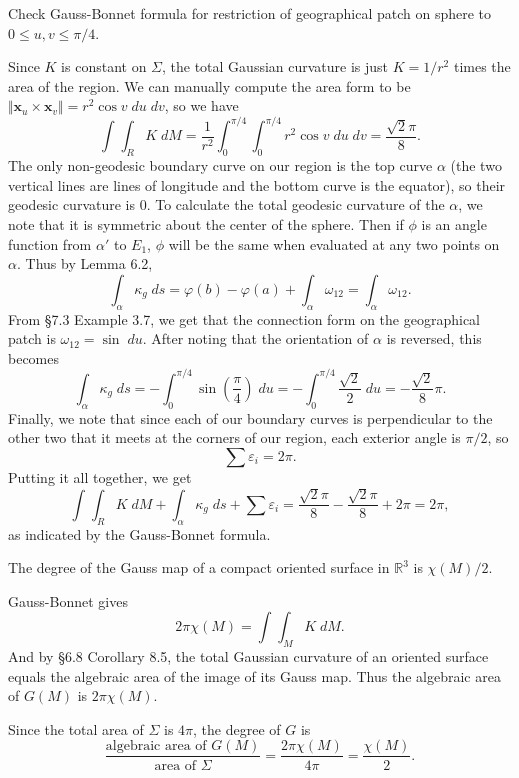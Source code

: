 \documentclass[10pt]{report}
\begin{document}
\pagebreak
\begin{exer}[7.6: 7]
Check Gauss-Bonnet formula for restriction of geographical patch on sphere to $0 \leq u,v \leq \pi/4$.
\end{exer}
Since $K$ is constant on $\Sigma$, the total Gaussian curvature is just $K=1/r^2$ times the area of the region. We can manually compute the area form to be ${\Vert{\mathbf{x}_{u}\times \mathbf{x}_{v}}\Vert} = r^2\cos v\;du\;dv$, so we have
\[
\int_{} \int_{R} K\;dM = \frac{1}{r^2} \int_{0}^{\pi/4} \int_{0}^{\pi/4} r^2 \cos v\;du\;dv = \frac{\sqrt{2} \pi}{8} .
\] 
The only non-geodesic boundary curve on our region is the top curve $\alpha$ (the two vertical lines are lines of longitude and the bottom curve is the equator), so their geodesic curvature is 0. To calculate the total geodesic curvature of the $\alpha$, we note that it is symmetric about the center of the sphere. Then if $\phi$ is an angle function from $\alpha'$ to $E_1$, $\phi$ will be the same when evaluated at any two points on $\alpha$. Thus by Lemma 6.2,
\[
	\int_{\alpha} \kappa_{g}\;ds = \varphi(b) -\varphi(a) + \int_{\alpha} \omega_{12} =  \int_{\alpha} \omega_{12}.
\] 
From \S 7.3 Example 3.7, we get that the connection form on the geographical patch is $\omega_{12}=\sin \;du$. After noting that the orientation of $\alpha$ is reversed, this becomes
\[
	\int_{\alpha} \kappa_{g}\;ds = - \int_{0}^{\pi/4} \sin \left( \frac{\pi}{4}  \right)\;du = -\int_{0}^{\pi/4} \frac{\sqrt{2} }{2} \;du = -\frac{\sqrt{2} }{8} \pi.
\] Finally, we note that since each of our boundary curves is perpendicular to the other two that it meets at the corners of our region, each exterior angle is $\pi/2$, so
\[
\sum \varepsilon_{i} = 2\pi.
\] Putting it all together, we get
\[
\int_{} \int_{R} K\;dM + \int_{\alpha} \kappa_{g}\;ds + \sum \varepsilon_{i} = \frac{\sqrt{2} \pi}{8} - \frac{\sqrt{2} \pi}{8} + 2\pi = 2\pi,
\] as indicated by the Gauss-Bonnet formula.

\pagebreak
\begin{exer}[7.6: 8]
	The degree of the Gauss map of a compact oriented surface in $\mathbb{R}^{3}$ is $\chi(M)/2$.
\end{exer}
Gauss-Bonnet gives
\[
	2\pi\chi(M) = \int_{} \int_{M} K\;dM.
\] And by \S 6.8 Corollary 8.5, the total Gaussian curvature of an oriented surface equals the algebraic area of the image of its Gauss map. Thus the algebraic area of $G(M)$ is $2\pi\chi(M)$.

Since the total area of $\Sigma$ is $4\pi$, the degree of $G$ is
\[
	\frac{\text{algebraic area of } G(M)}{\text{area of } \Sigma} = \frac{2\pi\chi(M)}{4\pi} = \frac{\chi(M)}{2} .
\] 
\end{document}
